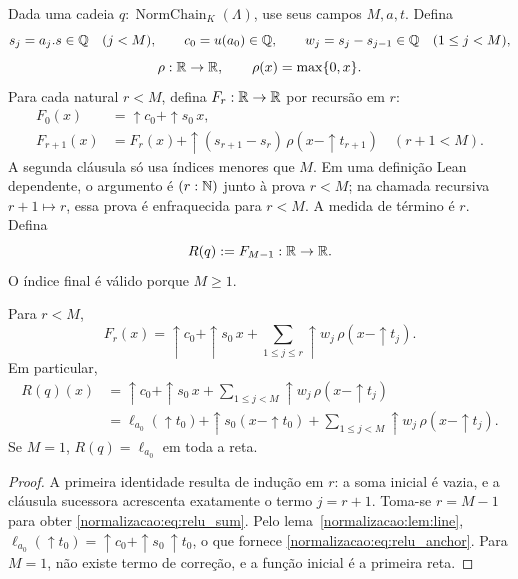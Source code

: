 \begin{definicao}\label{map:normalizacao:8.1}\label{normalizacao:def:relu}
Dada uma cadeia $q:\operatorname{NormChain}_K(\Lambda)$, use seus
campos $M,a,t$. Defina
\[
 s_j=a_j.s\in\mathbb Q\quad(j<M),\qquad
 c_0=u(a_0)\in\mathbb Q,\qquad
 w_j=s_j-s_{j-1}\in\mathbb Q\quad(1\le j<M),
\]
\[
 \rho:\mathbb R\to\mathbb R,\qquad\rho(x)=\max\{0,x\}.
\]
Para cada natural $r<M$, defina $F_r:\mathbb R\to\mathbb R$ por recursão em $r$:
\begin{align*}
 F_0(x)&=\uparrow c_0+\uparrow s_0\,x,\\
 F_{r+1}(x)&=F_r(x)+\uparrow(s_{r+1}-s_r)\,
                       \rho(x-\uparrow t_{r+1})
                    \quad(r+1<M).
\end{align*}
A segunda cláusula só usa índices menores que $M$. Em uma definição
Lean dependente, o argumento é $(r:\mathbb N)$ junto à prova $r<M$;
na chamada recursiva $r+1\mapsto r$, essa prova é enfraquecida
para $r<M$. A medida de término é $r$.
Defina
\[
 R(q):=F_{M-1}:\mathbb R\to\mathbb R.
\]
O índice final é válido porque $M\ge1$.
\end{definicao}

\begin{lema}\label{map:normalizacao:8.2}\label{normalizacao:lem:sum}
Para $r<M$,
\[
 F_r(x)=\uparrow c_0+\uparrow s_0\,x+
        \sum_{1\le j\le r}\uparrow w_j\,\rho(x-\uparrow t_j).
\]
Em particular,
\begin{align}
 R(q)(x)&=\uparrow c_0+\uparrow s_0\,x+
        \sum_{1\le j<M}\uparrow w_j\,\rho(x-\uparrow t_j)
                                                       \label{normalizacao:eq:relu_sum}\\
 &=\ell_{a_0}(\uparrow t_0)+\uparrow s_0(x-\uparrow t_0)+
        \sum_{1\le j<M}\uparrow w_j\,\rho(x-\uparrow t_j).
                                                       \label{normalizacao:eq:relu_anchor}
\end{align}
Se $M=1$, $R(q)=\ell_{a_0}$ em toda a reta.
\end{lema}
\begin{proof}
A primeira identidade resulta de indução em $r$: a soma inicial é vazia,
e a cláusula sucessora acrescenta exatamente o termo $j=r+1$.
Toma-se $r=M-1$ para obter \eqref{normalizacao:eq:relu_sum}. Pelo
lema~\ref{normalizacao:lem:line},
$\ell_{a_0}(\uparrow t_0)=\uparrow c_0+\uparrow s_0\,\uparrow t_0$,
o que fornece \eqref{normalizacao:eq:relu_anchor}. Para $M=1$, não existe termo de
correção, e a função inicial é a primeira reta.
\end{proof}

